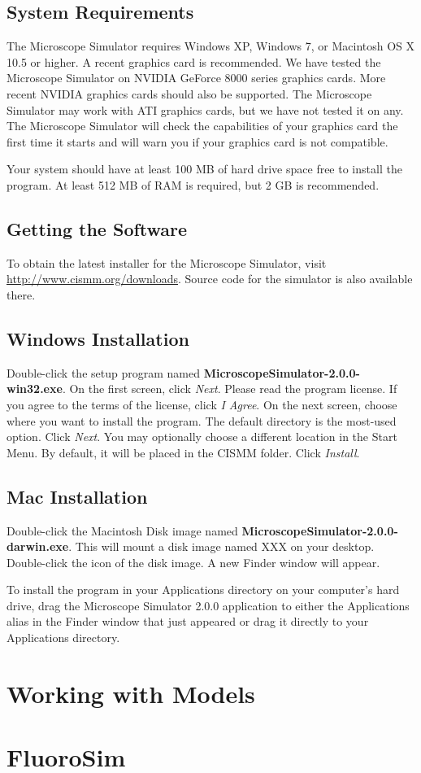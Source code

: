 \documentclass[11pt]{article}
\begin{document}
\subsection{System Requirements}

The Microscope Simulator requires Windows XP, Windows 7, or Macintosh OS X 10.5 or higher. A recent graphics card is recommended. We have tested the Microscope Simulator on NVIDIA GeForce 8000 series graphics cards. More recent NVIDIA graphics cards should also be supported. The Microscope Simulator may work with ATI graphics cards, but we have not tested it on any. The Microscope Simulator will check the capabilities of your graphics card the first time it starts and will warn you if your graphics card is not compatible.

Your system should have at least 100 MB of hard drive space free to install the program. At least 512 MB of RAM is required, but 2 GB is recommended.

\subsection{Getting the Software}

To obtain the latest installer for the Microscope Simulator, visit \url{http://www.cismm.org/downloads}. Source code for the simulator is also available there.

\subsection{Windows Installation}

Double-click the setup program named \textbf{MicroscopeSimulator-2.0.0-win32.exe}. On the first screen, click \emph{Next}. Please read the program license. If you agree to the terms of the license, click \emph{I Agree}. On the next screen, choose where you want to install the program. The default directory is the most-used option. Click \emph{Next}. You may optionally choose a different location in the Start Menu. By default, it will be placed in the CISMM folder. Click \emph{Install}. 

\subsection{Mac Installation}

Double-click the Macintosh Disk image named \textbf{MicroscopeSimulator-2.0.0-darwin.exe}. This will mount a disk image named XXX on your desktop. Double-click the icon of the disk image. A new Finder window will appear.

To install the program in your Applications directory on your computer's hard drive, drag the Microscope Simulator 2.0.0 application to either the Applications alias in the Finder window that just appeared or drag it directly to your Applications directory.

\section{Working with Models}

\section{FluoroSim}
\end{document}
